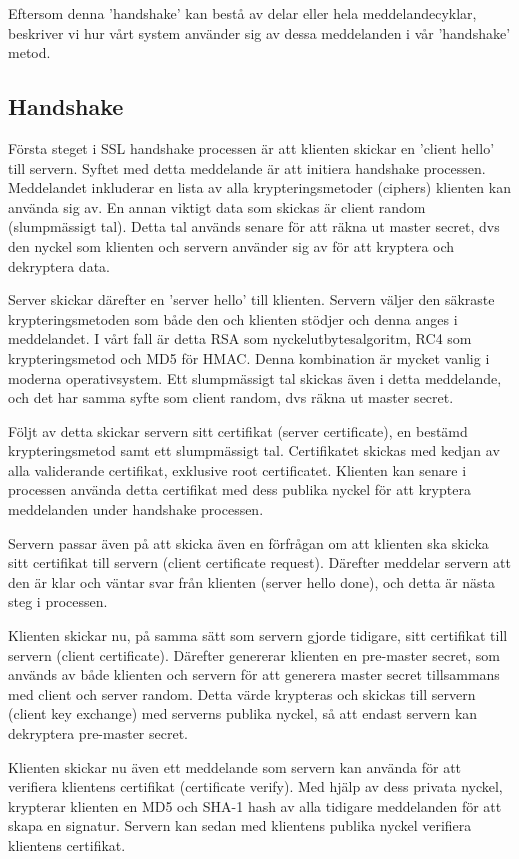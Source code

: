 Eftersom denna 'handshake' kan bestå av delar eller hela meddelandecyklar, beskriver vi hur vårt system använder sig av dessa meddelanden i vår 'handshake' metod.

\subsection{Handshake}
Första steget i SSL handshake processen är att klienten skickar en 'client hello' till servern. Syftet med detta meddelande är att initiera handshake processen. Meddelandet inkluderar en lista av alla krypteringsmetoder (ciphers) klienten kan använda sig av. En annan viktigt data som skickas är client random (slumpmässigt tal). Detta tal används senare för att räkna ut master secret, dvs den nyckel som klienten och servern använder sig av för att kryptera och dekryptera data.

Server skickar därefter en 'server hello' till klienten. Servern väljer den säkraste krypteringsmetoden som både den och klienten stödjer och denna anges i meddelandet. I vårt fall är detta RSA som nyckelutbytesalgoritm, RC4 som krypteringsmetod och MD5 för HMAC. Denna kombination är mycket vanlig i moderna operativsystem. Ett slumpmässigt tal skickas även i detta meddelande, och det har samma syfte som client random, dvs räkna ut master secret.

Följt av detta skickar servern sitt certifikat (server certificate), en bestämd krypteringsmetod samt ett slumpmässigt tal. Certifikatet skickas med kedjan av alla validerande certifikat, exklusive root certificatet. Klienten kan senare i processen använda detta certifikat med dess publika nyckel för att kryptera meddelanden under handshake processen.

Servern passar även på att skicka även en förfrågan om att klienten ska skicka sitt certifikat till servern (client certificate request). Därefter meddelar servern att den är klar och väntar svar från klienten (server hello done), och detta är nästa steg i processen.

Klienten skickar nu, på samma sätt som servern gjorde tidigare, sitt certifikat till servern (client certificate). Därefter genererar klienten en pre-master secret, som används av både klienten och servern för att generera master secret tillsammans med client och server random. Detta värde krypteras och skickas till servern (client key exchange) med serverns publika nyckel, så att endast servern kan dekryptera pre-master secret.

Klienten skickar nu även ett meddelande som servern kan använda för att verifiera klientens certifikat (certificate verify). Med hjälp av dess privata nyckel, krypterar klienten en MD5 och SHA-1 hash av alla tidigare meddelanden för att skapa en signatur. Servern kan sedan med klientens publika nyckel verifiera klientens certifikat.

